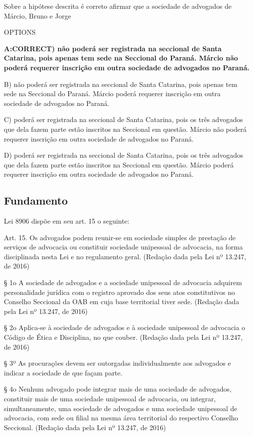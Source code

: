 \documentclass[12pt]{article}
\begin{document}
Sobre a hipótese descrita é correto afirmar que a sociedade de 
advogados de Márcio, Bruno e Jorge 
 
OPTIONS

\textbf{A:CORRECT) não poderá ser registrada na seccional de Santa Catarina, 
pois apenas tem sede na Seccional do Paraná. Márcio não 
poderá requerer inscrição em outra sociedade de 
advogados no Paraná. }

B) não poderá ser registrada na seccional de Santa Catarina, 
pois apenas tem sede na Seccional do Paraná. Márcio 
poderá requerer inscrição em outra sociedade de 
advogados no Paraná. 

C) poderá ser registrada na seccional de Santa Catarina, pois 
os três advogados que dela fazem parte estão inscritos na 
Seccional em questão. Márcio não poderá requerer 
inscrição em outra sociedade de advogados no Paraná. 

D) poderá ser registrada na seccional de Santa Catarina, pois 
os três advogados que dela fazem parte estão inscritos na 
Seccional em questão. Márcio poderá requerer inscrição 
em outra sociedade de advogados no Paraná. 

\subsection{Fundamento}

Lei 8906 dispõe em seu art. 15 o seguinte:

 Art. 15.  Os advogados podem reunir-se em sociedade simples de prestação de serviços de advocacia ou constituir sociedade unipessoal de advocacia, na forma disciplinada nesta Lei e no regulamento geral.          (Redação dada pela Lei nº 13.247, de 2016)


§ 1o  A sociedade de advogados e a sociedade unipessoal de advocacia adquirem personalidade jurídica com o registro aprovado dos seus atos constitutivos no Conselho Seccional da OAB em cuja base territorial tiver sede.           (Redação dada pela Lei nº 13.247, de 2016)

§ 2o  Aplica-se à sociedade de advogados e à sociedade unipessoal de advocacia o Código de Ética e Disciplina, no que couber.           (Redação dada pela Lei nº 13.247, de 2016)

§ 3º As procurações devem ser outorgadas individualmente aos advogados e indicar a sociedade de que façam parte.

§ 4o Nenhum advogado pode integrar mais de uma sociedade de advogados, constituir mais de uma sociedade unipessoal de advocacia, ou integrar, simultaneamente, uma sociedade de advogados e uma sociedade unipessoal de advocacia, com sede ou filial na mesma área territorial do respectivo Conselho Seccional.           (Redação dada pela Lei nº 13.247, de 2016)
\end{document}

